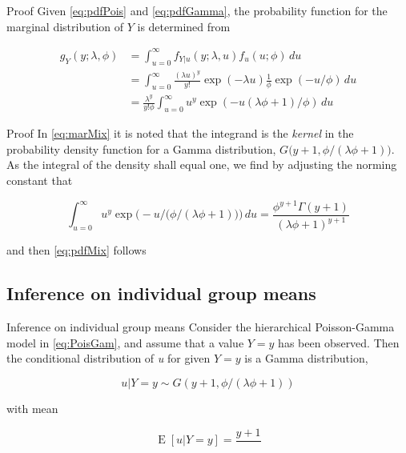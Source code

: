 \documentclass[aspectratio=169]{beamer}
\DeclareMathOperator{\E}{E}
\begin{document}
\begin{frame}{Proof}
\protect\hypertarget{proof-1}{}
Given \eqref{eq:pdfPois} and \eqref{eq:pdfGamma}, the probability
function for the marginal distribution of \(Y\) is determined from

\begin{equation} \label{eq:marMix}
  \begin{aligned}
    g_{Y}(y;\lambda,\phi)&=\int_{u=0}^\infty f_{Y|u}(y;\lambda, u) f_{u}(u;\phi) \,du \\
    &=\int_{u=0}^\infty \frac{(\lambda u)^y}{y!} \exp (-\lambda u) \frac{1}{\phi} \exp (-u/\phi) \,du\\
    &=\frac{\lambda^{y}}{y!\phi} \int_{u=0}^\infty u^y \exp (-u(\lambda \phi+1)/\phi) \,du
  \end{aligned}
\end{equation}
\end{frame}

\begin{frame}{Proof}
\protect\hypertarget{proof-2}{}
In \eqref{eq:marMix} it is noted that the integrand is the \emph{kernel}
in the probability density function for a Gamma distribution,
\(G\big(y+1,\phi/(\lambda \phi+1)\big)\). As the integral of the density
shall equal one, we find by adjusting the norming constant that

\begin{equation}
  \int_{u=0}^\infty u^y \exp \bigg(-u/\Big(\phi/(\lambda \phi+1)\Big)\bigg) \,du = \frac{\phi^{y+1}\Gamma(y+1)}{(\lambda \phi + 1)^{y+1}}
\end{equation}

and then \eqref{eq:pdfMix} follows
\end{frame}

\hypertarget{inference-on-individual-group-means}{%
\subsection{Inference on individual group
means}\label{inference-on-individual-group-means}}

\begin{frame}{Inference on individual group means}
Consider the hierarchical Poisson-Gamma model in \eqref{eq:PoisGam}, and
assume that a value \(Y=y\) has been observed. Then the conditional
distribution of \emph{u} for given \(Y=y\) is a Gamma distribution,

\begin{equation}
  u|Y=y\sim G(y+1,\phi/(\lambda \phi+1))
\end{equation}

with mean

\begin{equation}
  \E[u|Y=y]=\frac{y+1}{}
\end{equation}
\end{frame}
\end{document}
